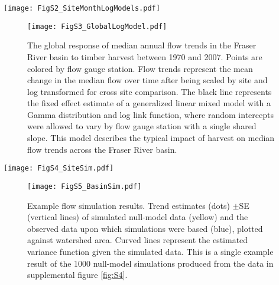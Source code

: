 \documentclass[draft,grl]{agutexSI}
\begin{document}
\begin{sidewaysfigure}[h]
	\centering
	\noindent\texttt{[image: FigS2\_SiteMonthLogModels.pdf]}
	\caption{The response of monthly median flow trends (1970-2007) to logging in 55 sub-basins (colors) of the Fraser River watershed. Timber harvest is quantified as the percent of watershed area cut in the previous five years. Flow trends represent the mean change in median flow over time after being scaled by site and log transformed to facilitate cross site comparsion. Lines, estimated using a linear model, depict the change in flow trends with increasing timber harvest for each flow gauge station.}
	\label{fig:S2}
\end{sidewaysfigure}

\begin{figure}[h]
	\centering
	\noindent\texttt{[image: FigS3\_GlobalLogModel.pdf]}
	\caption{The global response of median annual flow trends in the Fraser River basin to timber harvest between 1970 and 2007. Points are colored by flow gauge station. Flow trends represent the mean change in the median flow over time after being scaled by site and log transformed for cross site comparison. The black line represents the fixed effect estimate of a generalized linear mixed model with a Gamma distribution and log link function, where random intercepts were allowed to vary by flow gauge station with a single shared slope. This model describes the typical impact of harvest on median flow trends across the Fraser River basin.}
	\label{fig:S3}
\end{figure}

\begin{sidewaysfigure}[h]
	\centering
	\noindent\texttt{[image: FigS4\_SiteSim.pdf]}
	\caption{Example site specific flow simulations. Annual median-flow simulations (yellow) and observations (blue) for all 55 sites considered in this study found within the Fraser River basin. Simulations at each site were parameterized using the observed data but no trend was imposed. Fifty-five site simulations equate to one basin-wide simulation. Each flow metric was simulated 1000 times basin-wide per response variable. See supplemental figure \ref{fig:S5} for resultant basin-wide simulation.}
	\label{fig:S4}
\end{sidewaysfigure}

\begin{figure}[h]
	\centering
	\noindent\texttt{[image: FigS5\_BasinSim.pdf]}
	\caption{Example flow simulation results. Trend estimates (dots) $\pm$SE (vertical lines) of simulated null-model data (yellow) and the observed data upon which simulations were based (blue), plotted against watershed area. Curved lines represent the estimated variance function given the simulated data. This is a single example result of the 1000 null-model simulations produced from the data in supplemental figure \ref{fig:S4}.}
	\label{fig:S5}
\end{figure}
\end{document}
